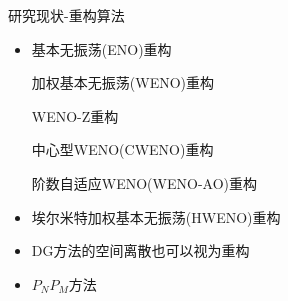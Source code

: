\documentclass[aspectratio=169]{beamer}
\begin{document}
\begin{frame}{研究现状-重构算法}
  
  \begin{itemize}[<+->]
    \item 基本无振荡(ENO)重构 \citep{ENO-1987}
          
          加权基本无振荡(WENO)重构 \citep{WENO,WENO-1994,WENO-1996,WENO-2020,WENOonTRI}
          
          WENO-Z重构 \citep{WENO_Z}
          
          中心型WENO(CWENO)重构 \citep{CWENO-origin,CWENO13579}
          
          阶数自适应WENO(WENO-AO)重构 \citep{WENOAO}
          
    \item 埃尔米特加权基本无振荡(HWENO)重构 \citep{Qiu-Shu-2004,Qiu-Shu-2005}
          
          
    \item DG方法的空间离散也可以视为重构 \citep{DG-1989,DG-1990,DG-2016}
          
    \item $P_NP_M$方法 \citep{PNPM,luo2012hermite,xia2014implicit}
          
  \end{itemize}
  
\end{frame}
\end{document}
